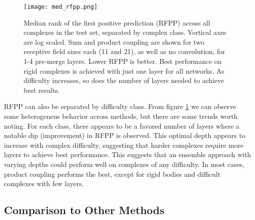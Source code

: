 \begin{figure}
	\texttt{[image: med\_rfpp.png]}
	\caption{Median rank of the first positive prediction (RFPP) across all complexes in the test set, separated by complex class. Vertical axes are log scaled. Sum and product coupling are shown for two receptive field sizes each (11 and 21), as well as no convolution, for 1-4 pre-merge layers. Lower RFPP is better. Best performance on rigid complexes is achieved with just one layer for all networks. As difficulty increases, so does the number of layers needed to achieve best results.
		\label{fig:med_rfpp}}
\end{figure}

RFPP can also be separated by difficulty class.
From figure \ref{fig:med_rfpp} we can observe some heterogeneus behavior across methods, but there are some trends worth noting.
For each class, there appears to be a favored number of layers where a notable dip (improvement) in RFPP is observed. 
This optimal depth appears to increase with complex difficulty, suggesting that harder complexes require more layers to achieve best performance.
This suggests that an ensemble approach with varying depths could perform well on complexes of any difficulty. 
In most cases, product coupling performs the best, except for rigid bodies and difficult complexes with few layers.



\subsection{Comparison to Other Methods}

